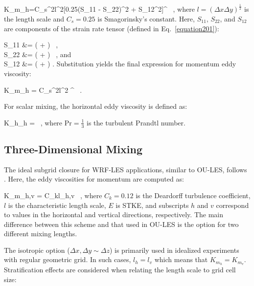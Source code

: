 \be
K_{m_{h}}=C_s^2l^2[0.25(S_{11} - S_{22})^2 + S_{12}^2]^{} \, , \label{equation368}
\ee
\noindent
 where $l=(\Delta x \Delta y)^{\frac{1}{2}}$ is the length scale and $C_s = 0.25$ is Smagorinsky's constant. Here, $S_{11}$, $S_{22}$, and $S_{12}$ are components of the strain rate tensor (defined in Eq.~\ref{equation201}):

\bse \label{equation369}
\bal
S_{11} &=  \left( + \right) \, , \label{equation369a} \\
S_{22} &=  \left( + \right) \, , \quad and \label{equation369b} \\
S_{12} &=  \left( + \right) \mbox{.} \label{equation369c}
\eal
\ese
\noindent
 Substitution yields the final expression for momentum eddy viscosity:

\be
K_{m_{h}} = C_s^2l^2 ^{} \, . \label{equation370}
\ee


For scalar mixing, the horizontal eddy viscosity is defined as:

\be
K_{h_{h}} =  \, , \label{equation371} 
\ee
\noindent
 where $\mathrm{Pr} = \frac{1}{3}$ is the turbulent Prandtl number.

\subsection{Three-Dimensional Mixing}
\label{threed-mix-372}

The ideal subgrid closure for WRF-LES applications, similar to OU-LES, follows  \citet{Deardorff1980}. Here, the eddy viscosities for momentum are computed as:

\be
K_{m_{h,v}} = C_kl_{h,v}  \, , \label{equation373}
\noindent
\ee
 where $C_k = 0.12$ is the Deardorff turbulence coefficient, $l$ is the characteristic length scale, $E$ is STKE, and subscripts $h$ and $v$ correspond to values in the horizontal and vertical directions, respectively. The main difference between this scheme and that used in OU-LES is the option for two different mixing lengths.

The isotropic option ($\Delta x, \Delta y \sim \Delta z$) is primarily used in idealized experiments with regular geometric grid. In such cases, $l_h = l_v$ which means that $K_{m_{h}} =  K_{m_{v}}$. Stratification effects are considered when relating the length scale to grid cell size:


